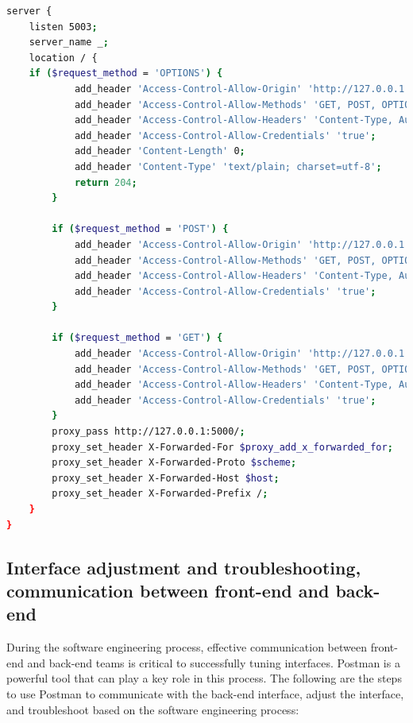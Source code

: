 \documentclass[journal]{IEEEtran}
\begin{document}
\begin{lstlisting}[caption={Nginx Configuration},label={lst:nginxconf},language=bash,breaklines=true]
server {
    listen 5003;
    server_name _;
    location / {
	if ($request_method = 'OPTIONS') {
            add_header 'Access-Control-Allow-Origin' 'http://127.0.0.1:3000';
            add_header 'Access-Control-Allow-Methods' 'GET, POST, OPTIONS';
            add_header 'Access-Control-Allow-Headers' 'Content-Type, Authorization';
            add_header 'Access-Control-Allow-Credentials' 'true';
            add_header 'Content-Length' 0;
            add_header 'Content-Type' 'text/plain; charset=utf-8';
            return 204;
        }

        if ($request_method = 'POST') {
            add_header 'Access-Control-Allow-Origin' 'http://127.0.0.1:3000';
            add_header 'Access-Control-Allow-Methods' 'GET, POST, OPTIONS';
            add_header 'Access-Control-Allow-Headers' 'Content-Type, Authorization';
            add_header 'Access-Control-Allow-Credentials' 'true';
        }

        if ($request_method = 'GET') {
            add_header 'Access-Control-Allow-Origin' 'http://127.0.0.1:3000';
            add_header 'Access-Control-Allow-Methods' 'GET, POST, OPTIONS';
            add_header 'Access-Control-Allow-Headers' 'Content-Type, Authorization';
            add_header 'Access-Control-Allow-Credentials' 'true';
        }
        proxy_pass http://127.0.0.1:5000/;
        proxy_set_header X-Forwarded-For $proxy_add_x_forwarded_for;
        proxy_set_header X-Forwarded-Proto $scheme;
        proxy_set_header X-Forwarded-Host $host;
        proxy_set_header X-Forwarded-Prefix /;
    }
}
\end{lstlisting}

\subsection{Interface adjustment and troubleshooting, communication between front-end and back-end}
During the software engineering process, effective communication between front-end and back-end teams is critical to successfully tuning interfaces. Postman is a powerful tool that can play a key role in this process. The following are the steps to use Postman to communicate with the back-end interface, adjust the interface, and troubleshoot based on the software engineering process:
\end{document}
